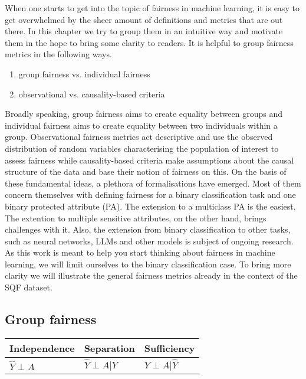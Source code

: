 When one starts to get into the topic of fairness in machine learning, it is easy to get overwhelmed by the sheer amount of definitions and metrics that are out there. In this chapter we try to group them in an intuitive way and motivate them in the hope to bring some clarity to readers. It is helpful to group fairness metrics in the following ways.
\begin{enumerate}
    \item group fairness vs. individual fairness
    \item observational vs. causality-based criteria
\end{enumerate}

Broadly speaking, group fairness aims to create equality between groups and individual fairness aims to create equality between two individuals within a group. Observational fairness metrics act descriptive and use the observed distribution of random variables characterising the population of interest to assess fairness while causality-based criteria make assumptions about the causal structure of the data and base their notion of fairness on this.
On the basis of these fundamental ideas, a plethora of formalisations have emerged. Most of them concern themselves with defining fairness for a binary classification task and one binary protected attribute (PA).
The extension to a multiclass PA is the easiest. The extention to multiple sensitive attributes, on the other hand, brings challenges with it. Also, the extension from binary classification to other tasks, such as neural networks, LLMs and other models is subject of ongoing research. As this work is meant to help you start thinking about fairness in machine learning, we will limit ourselves to the binary classification case.
To bring more clarity we will illustrate the general fairness metrics already in the context of the SQF dataset.

\subsection{Group fairness}
\begin{table}
    \begin{tabular}{lll}
        \toprule
        Independence & Separation & {Sufficiency} \\
        \midrule
        $\hat{Y} \perp A$ & $\hat{Y} \perp A | Y$ & {$Y \perp A | \hat{Y}$}\\
        \bottomrule
    \end{tabular}
\end{table}

